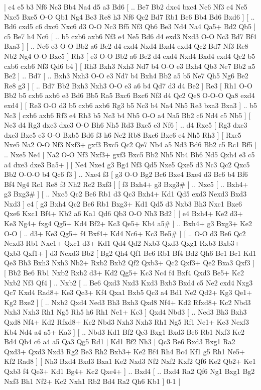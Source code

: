 \makegametitle 
|   c4   e5    b3   Nf6    Nc3   Bb4    Na4   d5    a3   Bd6 [ .. Be7  Bb2 dxc4  bxc4 Nc6  Nf3 e4  Ne5 Nxe5  Bxe5 O-O  Qb1 Ng4  Bc3 Re8  h3 Nf6  Qc2 Bd7  Rb1 Bc6  Bb4 Bd6  Bxd6   ]  [ .. Bd6  cxd5 c6  dxc6 Nxc6  d3 O-O  Nc3 Bf5  Nf3 Qb6  Be3 Nd4  Na4 Qa5+  Bd2 Qb5   ]  c5   Be7    h4   Nc6 [ .. b5  cxb6 axb6  Nf3 e4  Ne5 Bd6  d4 exd3  Nxd3 O-O  Nc3 Bd7  Bf4 Bxa3   ]  [ .. Nc6  e3 O-O  Bb2 a6  Be2 d4  exd4 Nxd4  Bxd4 exd4  Qc2 Bd7  Nf3 Re8  Nb2 Ng4  O-O Bxc5   ]  Rh3 [  e3 O-O  Bb2 a6  Be2 d4  exd4 Nxd4  Bxd4 exd4  Qc2 b5  cxb6 cxb6  Nf3 Qd6  b4   ]  [  Rh3 Bxh3  Nxh3 Nd7  b4 O-O  e3 Bxh4  Qb3 Ne7  Bb2 a5  Be2   ] .. Bd7 [ .. Bxh3  Nxh3 O-O  e3 Nd7  b4 Bxh4  Bb2 a5  b5 Ne7  Qh5 Ng6  Be2 Re8  g3   ]  [ .. Bd7  Bb2 Bxh3  Nxh3 O-O  e3 a6  b4 Qd7  d3 d4  Be2   ]  Re3 [  Rh1 O-O  Bb2 b5  cxb6 axb6  e3 Bd6  Bb5 Ra5  Bxc6 Bxc6  Nf3 d4  Qc2 Qe8  O-O-O Qa8  exd4 exd4   ]  [  Re3 O-O  d3 b5  cxb6 axb6  Rg3 b5  Nc3 b4  Na4 Nh5  Re3 bxa3  Bxa3   ] .. b5    Nc3 [  cxb6 axb6  Rf3 e4  Rh3 b5  Nc3 b4  Nb5 O-O  a4 Na5  Bb2 c6  Nd4 c5  Nb5   ]  [  Nc3 d4  Rg3 dxc3  dxc3 O-O  Bh6 Nh5  Rd3 Bxc5  e3 Nf6   ] .. d4    Rxe5 [  Rg3 dxc3  dxc3 Bxc5  e3 O-O  Bxb5 Bd6  f3 h6  Ne2 Rb8  Bxc6 Bxc6  e4 Nh5  Rh3   ]  [  Rxe5 Nxe5  Na2 O-O  Nf3 Nxf3+  gxf3 Bxc5  Qc2 Qe7  Nb4 a5  Nd3 Bd6  Bb2 c5  Rc1 Bf5   ] .. Nxe5    Ne4 [  Na2 O-O  Nf3 Nxf3+  gxf3 Bxc5  Bb2 Nh5  Nb4 Bb6  Nd5 Qxh4  e3 c5  a4 dxe3  dxe3 Ba5+   ]  [  Ne4 Nxe4  g3 Bg4  Nf3 Qd5  Nxe5 Qxe5  d3 Nc3  Qc2 Qxc5  Bb2 O-O-O  b4 Qc6  f3   ] .. Nxe4    f3 [  g3 O-O  Bg2 Bc6  Bxe4 Bxe4  d3 Bc6  b4 Bf6  Bf4 Ng4  Rc1 Re8  f3 Nh2  Rc2 Bxf3   ]  [  f3 Bxh4+  g3 Bxg3#   ] .. Nxc5 [ .. Bxh4+  g3 Bxg3#   ]  [ .. Nxc5  Qc2 Be6  Rb1 d3  Qc3 Bxh4+  Kd1 Qd5  exd3 Nexd3  Bxd3 Nxd3   ]  e4 [  g3 Bxh4  Qc2 Be6  Rb1 Bxg3+  Kd1 Qd5  d3 Nxb3  Bh3 Nxc1  Bxe6 Qxe6  Kxc1 Bf4+  Kb2 a6  Ka1 Qd6  Qb3 O-O  Nh3 Bd2   ]  [  e4 Bxh4+  Ke2 d3+  Ke3 Ng4+  fxg4 Qg5+  Kd4 Bf2+  Kc3 Qe5+  Kb4 a5#   ] .. Bxh4+    g3   Bxg3+    Ke2  O-O [ .. d3+  Ke3 Qg5+  f4 Bxf4+  Kd4 Nc6+  Kc3 Be5#   ]  [ .. O-O  d3 Be6  Qc2 Nexd3  Rb1 Nxc1+  Qxc1 d3+  Kd1 Qd4  Qd2 Nxb3  Qxd3 Qxg1  Rxb3 Bxb3+  Qxb3 Qxf1+   ]  d3   Ncxd3    Bb2 [  Bg2 Qh4  Qf1 Be6  Rb1 Bf4  Bd2 Qh6  Be1 Bc1  Kd1 Qe3  Bh3 Bxh3  Nxh3 Nb2+  Rxb2 Bxb2  Qf2 Qxb3+  Qc2 Qxf3+  Qe2 Bxa3  Qxf3   ]  [  Bb2 Be6  Rb1 Nxb2  Rxb2 d3+  Kd2 Qg5+  Kc3 Nc4  f4 Bxf4  Qxd3 Be5+  Kc2 Nxb2  Nf3 Qf4   ] .. Nxb2 [ .. Be6  Qxd3 Nxd3  Kxd3 Bxb3  Bxd4 c5  Ne2 cxd4  Nxg3 Qc7  Kxd4 Rad8+  Ke3 Qc3+  Kf4 Qxa1  Bxb5 Qc3  a4 Bd1  Ne2 Qd2+  Kg3 Qe1+  Kg2 Bxe2   ]  [ .. Nxb2  Qxd4 Ned3  Bh3 Bxh3  Qxd8 Nf4+  Kd2 Rfxd8+  Kc2 Nbd3  Nxh3 Nxh3  Rh1 Ng5  Rh5 h6  Rh1 Ne1+  Kc3   ]  Qxd4   Nbd3 [ .. Ned3  Bh3 Bxh3  Qxd8 Nf4+  Kd2 Rfxd8+  Kc2 Nbd3  Nxh3 Nxh3  Rh1 Ng5  Rf1 Ne1+  Kc3 Nexf3  Kb4 Nd4  a4 a5+  Ka3   ]  [ .. Nbd3  Kd1 Bf2  Qc3 Bxg1  Bxd3 Be6  Rb1 Nxf3  Kc2 Bd4  Qb4 c6  a4 a5  Qa3 Qg5  Rd1   ]  Kd1   Bf2    Nh3 [  Qc3 Be6  Bxd3 Bxg1  Ra2 Qxd3+  Qxd3 Nxd3  Rg2 Be3  Rh2 Bxb3+  Ke2 Bf4  Rh4 Bc4  Kf1 g5  Rh1 Ne5+  Kf2 Rad8   ]  [  Nh3 Bxd4  Bxd3 Bxa1  Ke2 Nxd3  Nf2 Nxf2  Kxf2 Qf6  Ke2 Qb2+  Ke1 Qxb3  f4 Qe3+  Kd1 Bg4+  Kc2 Qxe4+   ] .. Bxd4    [ .. Bxd4  Ra2 Qf6  Ng1 Bxg1  Bg2 Nxf3  Bh1 Nf2+  Kc2 Nxh1  Rb2 Bd4  Ra2 Qh6  Kb1   ] 0-1  |
